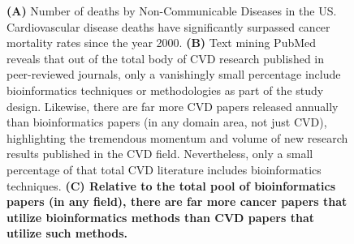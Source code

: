 \documentclass[letter]{bioinfo}
\begin{document}
\begin{figure}[!tpb]
	\caption{\textbf{(A)} Number of deaths by Non-Communicable Diseases in the US.  Cardiovascular disease deaths have significantly surpassed cancer mortality rates since the year 2000.  \textbf{(B)} Text mining PubMed reveals that out of the total body of CVD research published in peer-reviewed journals, only a vanishingly small percentage include bioinformatics techniques or methodologies as part of the study design.  Likewise, there are far more CVD papers released annually than bioinformatics papers (in any domain area, not just CVD), highlighting the tremendous momentum and volume of new research results published in the CVD field.  Nevertheless, only a small percentage of that total CVD literature includes bioinformatics techniques.  \textbf{(C) Relative to the total pool of bioinformatics papers (in any field), there are far more cancer papers that utilize bioinformatics methods than CVD papers that utilize such methods.}}
	\label{fig:figure1}
\end{figure}
\end{document}
